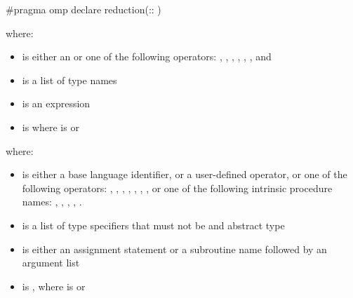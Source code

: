 \begin{cppspecific}
\begin{ompcPragma}
#pragma omp declare reduction(::
)
\end{ompcPragma}

where:

\begin{itemize}
\item {} is either an  or one of the following
operators:
\code{+},
\code{-},
\code{*},
\code{&},
\code{|},
\code{^},
\code{&&} and
\code{||}

\item {} is a list of type names

\item {} is an expression

\item {} is \code{)}
where  is\linebreak
{}  or \code{(}\code{)}
\end{itemize}
\end{cppspecific}


\begin{fortranspecific}

where:

\begin{itemize}
\item {} is either a base language identifier, or a user-defined operator, or
one of the following operators:
\code{+},
\code{-},
\code{*},
,
,
,
, or one of the following intrinsic procedure names:
,
,
,
,
.

\item {} is a list of type specifiers that must not be  and abstract type

\item {} is either an assignment statement or a subroutine name followed by an
argument list

\item {} is \code{)},
where  is\linebreak
{} or \code{(}\code{)}
\end{itemize}
\end{fortranspecific}

